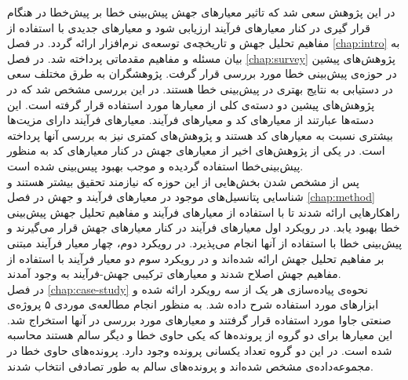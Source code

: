 در این پژوهش سعی شد که تاثیر معیار‌های جهش پیش‌بینی خطا بر پیش‌خطا در هنگام قرار گیری در کنار معیار‌های فرآیند ارزیابی  شود و معیارهای جدیدی با استفاده از مفاهیم تحلیل جهش و تاریخچه‌ی توسعه‌ی نرم‌افزار ارائه گردد. در فصل \ref{chap:intro} به بیان مسئله و مفاهیم مقدماتی پرداخته شد. در فصل \ref{chap:survey}  پژوهش‌های پیشین در حوزه‌ی پیش‌بینی خطا مورد بررسی قرار گرفت. پژوهشگران به طرق مختلف سعی در دستیابی به نتایج بهتری در پیش‌بینی خطا هستند. در این بررسی مشخص شد که در پژوهش‌های پیشین دو دسته‌ی کلی از معیارها مورد استفاده قرار گرفته است. این دسته‌ها عبارتند از معیارهای کد و معیارهای فرآیند. معیارهای فرآیند دارای مزیت‌ها بیشتری نسبت به معیارهای کد هستند و پژوهش‌های کمتری نیز به بررسی آنها پرداخته است. در یکی از پژوهش‌های اخیر از معیارهای جهش  در کنار معیارهای کد به منظور پیش‌بینی‌خطا استفاده گردیده و موجب بهبود پیس‌بینی شده است. \\

پس از مشخص شدن بخش‌هایی از این حوزه که نیازمند تحقیق بیشتر هستند و شناسایی پتانسیل‌های موجود در معیارهای فرآیند و جهش در فصل \ref{chap:method} راهکارهایی ارائه شدند تا با استفاده از معیارهای فرآیند و مفاهیم تحلیل جهش پیش‌بینی خطا بهبود یابد. در رویکرد اول معیارهای فرآیند در کنار معیارهای جهش قرار می‌گیرند و پیش‌بینی خطا با استفاده از آنها انجام می‌پذیرد. در رویکرد دوم، چهار معیار فرآیند مبتنی بر مفاهیم تحلیل جهش ارائه شده‌اند و در رویکرد سوم دو معیار فرآیند با استفاده از مفاهیم جهش اصلاح شدند و معیارهای ترکیبی جهش-فرآیند به وجود آمدند. \\

در فصل \ref{chap:case-study}  نحوه‌ی پیاده‌سازی هر یک از سه رویکرد ارائه شده و ابزارهای مورد استفاده شرح داده شد. به منظور انجام مطالعه‌ی موردی ۵ پروژه‌ی صنعتی جاوا مورد استفاده قرار گرفتند و معیارهای مورد بررسی در آنها استخراج شد. این معیارها برای دو گروه از پرونده‌ها که یکی حاوی خطا و دیگر سالم هستند محاسبه شده است. در این دو گروه تعداد یکسانی پرونده وجود دارد. پرونده‌های حاوی خطا در مجموعه‌داده‌ی  مشخص شده‌اند و پرونده‌های سالم به طور تصادفی انتخاب شدند. \\

